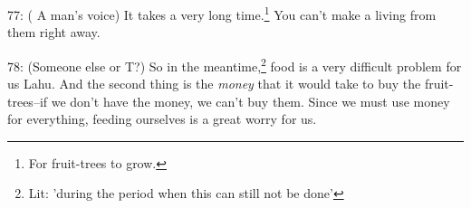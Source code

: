 77: ( A man's voice) It takes a very long time.\footnote{For fruit-trees to grow.} You can't make a living from
them right away.

78: (Someone else or T?) So in the meantime,\footnote{Lit: 'during the period when this can still not be done'} food is a very difficult problem
for us Lahu. And the second thing is the \textit{money} that it would take to buy
the fruit-trees--if we don't have the money, we can't buy them. Since we must use
money for everything, feeding ourselves is a great worry for us.

